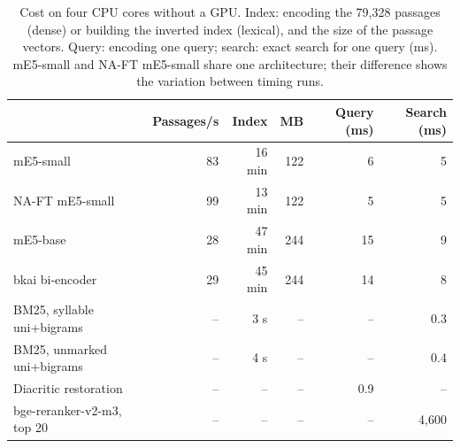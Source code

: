 \begin{table}[t]
\centering
\caption{Cost on four CPU cores without a GPU. Index: encoding the 79,328
passages (dense) or building the inverted index (lexical), and the size of the passage vectors. Query: encoding one
query; search: exact search for one query (ms). mE5-small and NA-FT mE5-small share one architecture; their difference
shows the variation between timing runs.}
\label{tab:efficiency}
\small
\setlength{\tabcolsep}{4pt}
\begin{tabular}{@{}l r r r r r@{}}
\toprule
 & Passages/s & Index & MB & Query (ms) & Search (ms) \\
\midrule
mE5-small & 83 & 16 min & 122 & 6 & 5 \\
NA-FT mE5-small & 99 & 13 min & 122 & 5 & 5 \\
mE5-base & 28 & 47 min & 244 & 15 & 9 \\
bkai bi-encoder & 29 & 45 min & 244 & 14 & 8 \\
\midrule
BM25, syllable uni+bigrams & -- & 3 s & -- & -- & 0.3 \\
BM25, unmarked uni+bigrams & -- & 4 s & -- & -- & 0.4 \\
Diacritic restoration & -- & -- & -- & 0.9 & -- \\
bge-reranker-v2-m3, top 20 & -- & -- & -- & -- & 4,600 \\
\bottomrule
\end{tabular}
\end{table}
